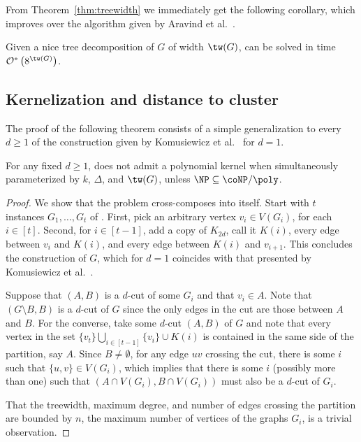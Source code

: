 From Theorem~\ref{thm:treewidth} we immediately get the following corollary, which improves over the algorithm given by Aravind et al.~\cite{matching_cut_structural}.

\begin{corollary}
   Given a nice tree decomposition of $G$ of width $\tw(G)$,  can be solved in time  $\bigOs{8^{\tw(G)}}$.
\end{corollary}

\subsection{Kernelization and distance to cluster}
\label{sec:kernelization}

The proof of the following theorem consists of a simple generalization to every $d \geq 1$ of the construction given by Komusiewicz et al.~\cite{matching_cut_ipec}  for $d=1$.

\begin{theorem}\label{thm:no-kernel}
    For any fixed $d \geq 1$,  does not admit a polynomial kernel when simultaneously parameterized by $k$, $\Delta$, and $\tw(G)$, unless $\NP \subseteq \coNP/\poly$.
\end{theorem}

\begin{proof}
    We show that the problem cross-composes into itself.
    Start with $t$ instances $G_1, \dots, G_t$ of .
    First, pick an arbitrary vertex $v_i \in V(G_i)$, for each $i \in [t]$.
    Second, for $i \in [t-1]$,  add a copy of $K_{2d}$, call it $K(i)$, every edge between $v_i$ and $K(i)$, and every edge between $K(i)$ and $v_{i+1}$.
    This concludes the construction of $G$, which  for $d=1$ coincides with that presented by Komusiewicz et al.~\cite{matching_cut_ipec}.

    Suppose that $(A, B)$ is a $d$-cut of some $G_i$ and that $v_i \in A$.
    Note that $(G \setminus B, B)$ is a $d$-cut of $G$ since the only edges in the cut are those between $A$ and $B$.
    For the converse, take some $d$-cut $(A, B)$ of $G$ and note that every vertex in the set $\{v_t\} \bigcup_{i \in [t-1]}\{v_i\} \cup K(i)$ is contained in the same side of the partition, say $A$.
    Since $B \neq \emptyset$, for any edge $uv$ crossing the cut, there is some $i$ such that $\{u,v\} \in V(G_i)$, which implies that there is some $i$ (possibly more than one) such that $(A \cap V(G_i), B \cap V(G_i))$ must also be a $d$-cut of $G_i$.

    That the treewidth, maximum degree, and number of edges crossing the partition are bounded by $n$, the maximum number of vertices of the graphs $G_i$, is a trivial observation.
\end{proof}

